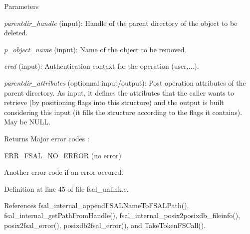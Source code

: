 \begin{DoxyParams}{Parameters}
\item[{\em parentdir\_\-handle}](input): Handle of the parent directory of the object to be deleted. \item[{\em p\_\-object\_\-name}](input): Name of the object to be removed. \item[{\em cred}](input): Authentication context for the operation (user,...). \item[{\em parentdir\_\-attributes}](optionnal input/output): Post operation attributes of the parent directory. As input, it defines the attributes that the caller wants to retrieve (by positioning flags into this structure) and the output is built considering this input (it fills the structure according to the flags it contains). May be NULL.\end{DoxyParams}
\begin{DoxyReturn}{Returns}
Major error codes :
\begin{DoxyItemize}
\item ERR\_\-FSAL\_\-NO\_\-ERROR (no error)
\item Another error code if an error occured. 
\end{DoxyItemize}
\end{DoxyReturn}


Definition at line 45 of file fsal\_\-unlink.c.

References fsal\_\-internal\_\-appendFSALNameToFSALPath(), fsal\_\-internal\_\-getPathFromHandle(), fsal\_\-internal\_\-posix2posixdb\_\-fileinfo(), posix2fsal\_\-error(), posixdb2fsal\_\-error(), and TakeTokenFSCall().